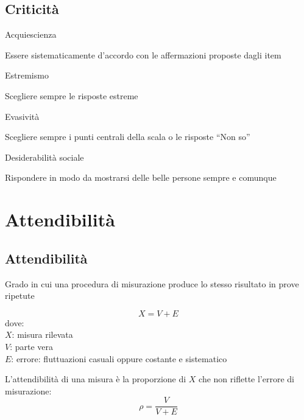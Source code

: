 \documentclass[compress]{beamer}
\begin{document}
\subsection*{Criticità}
\begin{frame}
	\begin{block}{Acquiescienza}
		
		Essere sistematicamente d'accordo con le affermazioni proposte dagli item
	\end{block}
	
\begin{block}{Estremismo}
	
	Scegliere sempre le risposte estreme
\end{block}

\begin{block}{Evasività}
	
	Scegliere sempre i punti centrali della scala o le risposte ``Non so''
\end{block}

\begin{block}{Desiderabilità sociale}
	
Rispondere in modo da mostrarsi delle belle persone sempre e comunque	
\end{block}

\end{frame}

\section{Attendibilità}

\subsection*{Attendibilità}

\begin{frame}
	
	Grado in cui una procedura di misurazione produce lo stesso risultato in prove ripetute
	
	\begin{equation*}
		X = V + E
	\end{equation*}
	dove: \\
	$X$: misura rilevata\\
	$V$: parte vera\\
	$E$: errore: fluttuazioni casuali oppure costante e sistematico
	
\vspace{2mm}
	L'attendibilità di una misura è la proporzione di $X$ che non riflette l'errore di misurazione: 
	\begin{equation*}
		\rho = \dfrac{V}{V + E}
	\end{equation*}
	
\end{frame}
\end{document}
